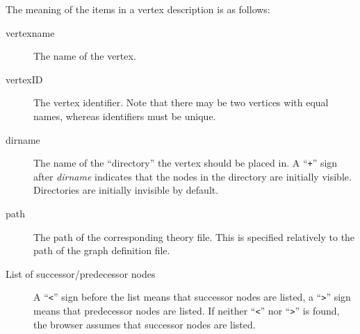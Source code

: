 The meaning of the items in a vertex description is as follows:
\begin{description}
  
\item[vertexname] The name of the vertex.
  
\item[vertexID] The vertex identifier. Note that there may be two
  vertices with equal names, whereas identifiers must be unique.
  
\item[dirname] The name of the ``directory'' the vertex should be
  placed in.  A ``{\tt +}'' sign after {\it dirname} indicates that
  the nodes in the directory are initially visible. Directories are
  initially invisible by default.
  
\item[path] The path of the corresponding theory file. This is
  specified relatively to the path of the graph definition file.
  
\item[List of successor/predecessor nodes] A ``{\tt <}'' sign before
  the list means that successor nodes are listed, a ``{\tt >}'' sign
  means that predecessor nodes are listed. If neither ``{\tt <}'' nor
  ``{\tt >}'' is found, the browser assumes that successor nodes are
  listed.

\end{description}
